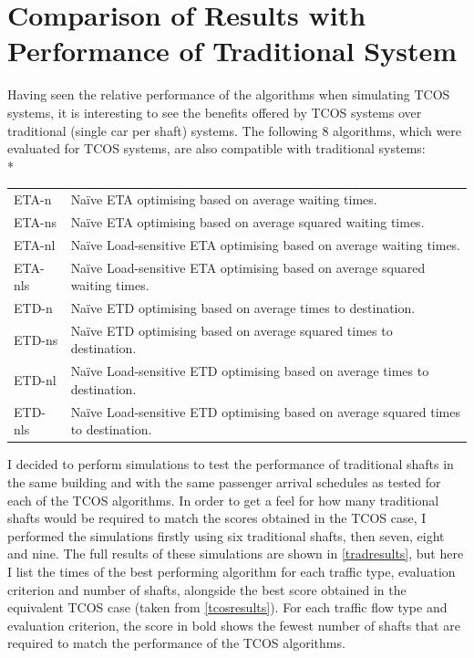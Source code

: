 \documentclass{UoYCSproject}
\begin{document}
\section{Comparison of Results with Performance of Traditional System}
\label{tcosvssingle}

Having seen the relative performance of the algorithms when simulating TCOS systems,  it is interesting to see the benefits offered by TCOS systems over traditional (single car per shaft) systems.  The following 8 algorithms, which were evaluated for TCOS systems, are also compatible with traditional systems:\\*

\begin{tabularx}{\linewidth}{l X}
	ETA-n		& Na\"{i}ve ETA optimising based on average waiting times. \\
	ETA-ns		& Na\"{i}ve ETA optimising based on average squared waiting times. \\
	ETA-nl		& Na\"{i}ve Load-sensitive ETA optimising based on average waiting times. \\
	ETA-nls		& Na\"{i}ve Load-sensitive ETA optimising based on average squared waiting times. \\
	ETD-n		& Na\"{i}ve ETD optimising based on average times to destination. \\
	ETD-ns		& Na\"{i}ve ETD optimising based on average squared times to destination. \\
	ETD-nl		& Na\"{i}ve Load-sensitive ETD optimising based on average times to destination. \\
	ETD-nls		& Na\"{i}ve Load-sensitive ETD optimising based on average squared times to destination.
\end{tabularx}

I decided to perform simulations to test the performance of traditional shafts in the same building and with the same passenger arrival schedules as tested for each of the TCOS algorithms.  In order to get a feel for how many traditional shafts would be required to match the scores obtained in the TCOS case, I performed the simulations firstly using six traditional shafts, then seven, eight and nine.  The full results of these simulations are shown in \autoref{tradresults}, but here I list the times of the best performing algorithm for each traffic type, evaluation criterion and number of shafts, alongside the best score obtained in the equivalent TCOS case (taken from \autoref{tcosresults}).  For each traffic flow type and evaluation criterion, the score in bold shows the fewest number of shafts that are required to match the performance of the TCOS algorithms.
\end{document}
